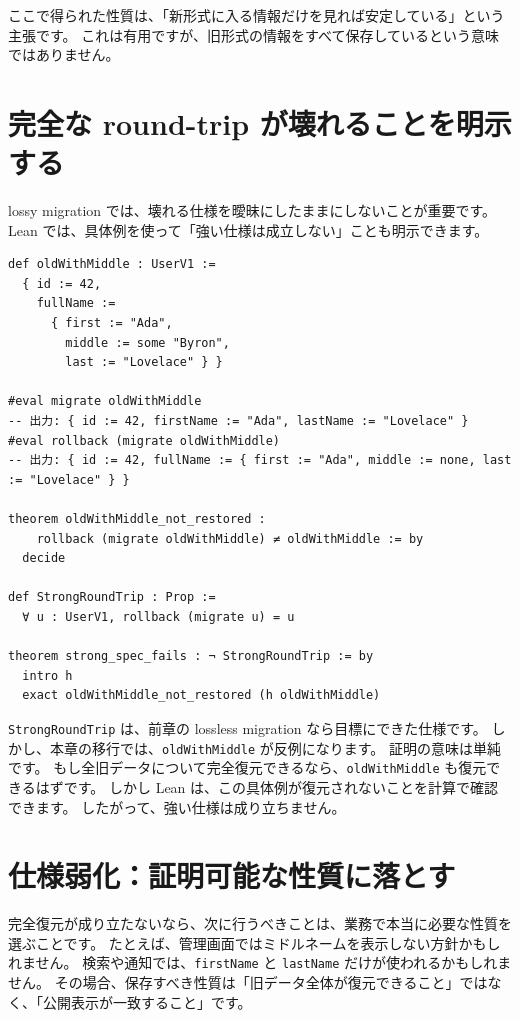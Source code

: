 ここで得られた性質は、「新形式に入る情報だけを見れば安定している」という主張です。
これは有用ですが、旧形式の情報をすべて保存しているという意味ではありません。

\section{完全な round-trip が壊れることを明示する}

lossy migration では、壊れる仕様を曖昧にしたままにしないことが重要です。
Lean では、具体例を使って「強い仕様は成立しない」ことも明示できます。

\begin{listing}[htbp]
\begin{verbatim}
def oldWithMiddle : UserV1 :=
  { id := 42,
    fullName :=
      { first := "Ada",
        middle := some "Byron",
        last := "Lovelace" } }

#eval migrate oldWithMiddle
-- 出力: { id := 42, firstName := "Ada", lastName := "Lovelace" }
#eval rollback (migrate oldWithMiddle)
-- 出力: { id := 42, fullName := { first := "Ada", middle := none, last := "Lovelace" } }

theorem oldWithMiddle_not_restored :
    rollback (migrate oldWithMiddle) ≠ oldWithMiddle := by
  decide

def StrongRoundTrip : Prop :=
  ∀ u : UserV1, rollback (migrate u) = u

theorem strong_spec_fails : ¬ StrongRoundTrip := by
  intro h
  exact oldWithMiddle_not_restored (h oldWithMiddle)
\end{verbatim}
\caption{\texttt{strong\_spec\_fails}}
\label{lst:ch29-strong-fails}
\end{listing}

\texttt{StrongRoundTrip} は、前章の lossless migration なら目標にできた仕様です。
しかし、本章の移行では、\texttt{oldWithMiddle} が反例になります。
証明の意味は単純です。
もし全旧データについて完全復元できるなら、\texttt{oldWithMiddle} も復元できるはずです。
しかし Lean は、この具体例が復元されないことを計算で確認できます。
したがって、強い仕様は成り立ちません。

\section{仕様弱化：証明可能な性質に落とす}

完全復元が成り立たないなら、次に行うべきことは、業務で本当に必要な性質を選ぶことです。
たとえば、管理画面ではミドルネームを表示しない方針かもしれません。
検索や通知では、\texttt{firstName} と \texttt{lastName} だけが使われるかもしれません。
その場合、保存すべき性質は「旧データ全体が復元できること」ではなく、「公開表示が一致すること」です。

